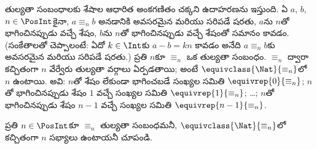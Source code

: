 \documentclass[../../../include/open-logic-section]{subfiles}
\begin{document}
\begin{ex}
తుల్యతా సంబంధాలకు శేషాల ఆధారిత అంకగణితం చక్కని ఉదాహరణను ఇస్తుంది.
ఏ $a$, $b$, $n \in \PosInt$కైనా, $a \equiv_n b$ అనడానికి అవసరమైన
మరియు సరిపడే షరతు, $a$ను $n$తో భాగించినప్పుడు వచ్చే శేషం,
$b$ను $n$తో భాగించినప్పుడు వచ్చే శేషంతో సమానం కావడం.
(సంకేతాలతో చెప్పాలంటే: ఏదో $k \in \Int$కు $a - b = kn$ కావడం
అనేది $a \equiv_n b$కు అవసరమైన మరియు సరిపడే షరతు.)
ప్రతి $n$కూ $\equiv_n$ ఒక తుల్యతా సంబంధం.
$\equiv_n$ ద్వారా కచ్చితంగా $n$ వేర్వేరు తుల్యతా వర్గాలు ఏర్పడతాయి;
అంటే $\equivclass{\Nat}{\equiv_n}$లో $n$  ఉంటాయి.
అవి: $n$తో శేషం లేకుండా భాగించబడే సంఖ్యల సమితి
$\equivrep{0}{\equiv_n}$; $n$తో భాగించినప్పుడు శేషం $1$ వచ్చే
సంఖ్యల సమితి $\equivrep{1}{\equiv_n}$; \ldots; $n$తో భాగించినప్పుడు
శేషం $n-1$ వచ్చే సంఖ్యల సమితి $\equivrep{n-1}{\equiv_n}$.
\end{ex}

\begin{prob}
ప్రతి $n \in \PosInt$కూ $\equiv_n$ తుల్యతా సంబంధమనీ,
$\equivclass{\Nat}{\equiv_n}$లో కచ్చితంగా $n$ సభ్యాలు ఉంటాయనీ చూపండి.
\end{prob}
\end{document}
